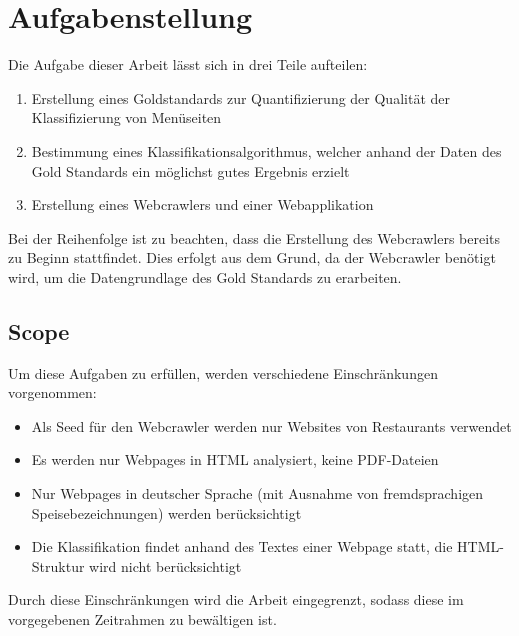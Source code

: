 \chapter{Aufgabenstellung}
Die Aufgabe dieser Arbeit lässt sich in drei Teile aufteilen:
\begin{enumerate}
	\item Erstellung eines Goldstandards zur Quantifizierung der Qualität der Klassifizierung von Menüseiten
	\item Bestimmung eines Klassifikationsalgorithmus, welcher anhand der Daten des Gold Standards ein möglichst gutes Ergebnis erzielt
	\item Erstellung eines Webcrawlers und einer Webapplikation
\end{enumerate}
Bei der Reihenfolge ist zu beachten, dass die Erstellung des Webcrawlers bereits zu Beginn stattfindet.
Dies erfolgt aus dem Grund, da der Webcrawler benötigt wird, um die Datengrundlage des Gold Standards zu erarbeiten.
\section{Scope}
\label{chap:scope}
Um diese Aufgaben zu erfüllen, werden verschiedene Einschränkungen vorgenommen:
\begin{itemize}
	\item Als Seed für den Webcrawler werden nur Websites von Restaurants verwendet
	\item Es werden nur Webpages in HTML analysiert, keine PDF-Dateien
	\item Nur Webpages in deutscher Sprache (mit Ausnahme von fremdsprachigen Speisebezeichnungen) werden berücksichtigt
	\item Die Klassifikation findet anhand des Textes einer Webpage statt, die HTML-Struktur wird nicht berücksichtigt
\end{itemize}
Durch diese Einschränkungen wird die Arbeit eingegrenzt, sodass diese im vorgegebenen Zeitrahmen zu bewältigen ist.